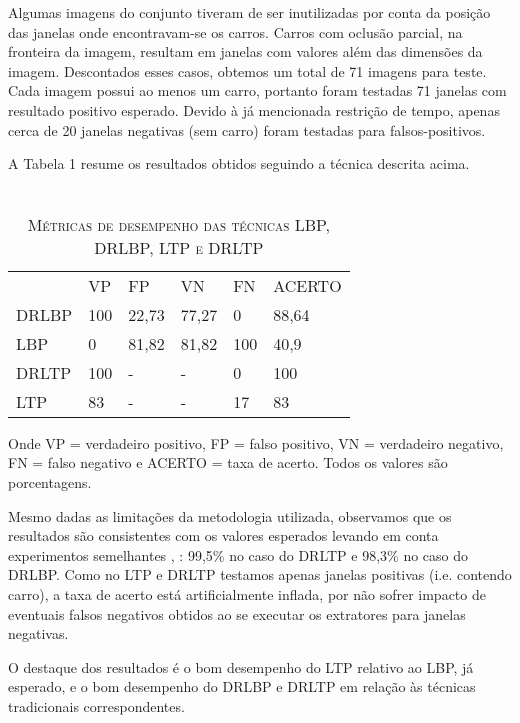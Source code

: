\documentclass[a4paper,twocolumn]{article}
\begin{document}
Algumas imagens do conjunto tiveram de ser inutilizadas por conta da posição das janelas onde encontravam-se os carros. Carros com oclusão parcial, na fronteira da imagem, resultam em janelas com valores além das dimensões da imagem. Descontados esses casos, obtemos um total de 71 imagens para teste. Cada imagem possui ao menos um carro, portanto foram testadas 71 janelas com resultado positivo esperado. Devido à já mencionada restrição de tempo, apenas cerca de 20 janelas negativas (sem carro) foram testadas para falsos-positivos.

A Tabela 1 resume os resultados obtidos seguindo a técnica descrita acima.

\begin{table}[h]
      \caption{{\scshape \\Métricas de desempenho das técnicas LBP, DRLBP, LTP e DRLTP}}
      \begin{tabular}{llllll}
            & VP  & FP    & VN    & FN  & ACERTO \\
      DRLBP & 100 & 22,73 & 77,27 & 0   & 88,64  \\
      LBP   & 0   & 81,82 & 81,82 & 100 & 40,9   \\
      DRLTP & 100 & -     & -     & 0   & 100    \\
      LTP   & 83  & -     & -     & 17  & 83    
      \end{tabular}

\end{table}

Onde VP = verdadeiro positivo, FP = falso positivo, VN = verdadeiro negativo, FN = falso negativo e ACERTO = taxa de acerto. Todos os valores são porcentagens.

Mesmo dadas as limitações da metodologia utilizada, observamos que os resultados são consistentes com os valores esperados levando em conta experimentos semelhantes \cite{satpathy}, \cite{khoo}: 99,5\% no caso do DRLTP e 98,3\% no caso do DRLBP. Como no LTP e DRLTP testamos apenas janelas positivas (i.e. contendo carro), a taxa de acerto está artificialmente inflada, por não sofrer impacto de eventuais falsos negativos obtidos ao se executar os extratores para janelas negativas. 

O destaque dos resultados é o bom desempenho do LTP relativo ao LBP, já esperado\cite{khoo}, e o bom desempenho do DRLBP e DRLTP em relação às técnicas tradicionais correspondentes.


\end{document}
